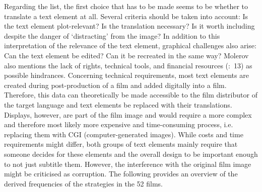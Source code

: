 Regarding the list, the first choice that has to be made seems to be whether to translate a text element at all. Several criteria should be taken into account: Is the text element plot-relevant? Is the translation necessary? Is it worth including despite the danger of ‘distracting’ from the image? In addition to this interpretation of the relevance of the text element, graphical challenges also arise: Can the text element be edited? Can it be recreated in the same way? Molerov also mentions the lack of rights, technical tools, and financial resources (\citeyear{molerov2012}:~13) as possible hindrances. Concerning technical requirements, most text elements are created during post-production of a film and added digitally into a film. Therefore, this data can theoretically be made accessible to the film distributor of the target language and text elements be replaced with their translations. Displays, however, are part of the film image and would require a more complex and therefore most likely more expensive and time-consuming process, i.e. replacing them with CGI (computer-generated images). While costs and time requirements might differ, both groups of text elements mainly require that someone decides for these elements and the overall design to be important enough to not just subtitle them. However, the interference with the original film image might be criticised as corruption. The following  provides an overview of the derived frequencies of the strategies in the 52 films.

